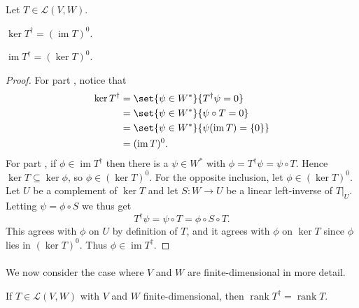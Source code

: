 \documentclass[a4paper, 11pt]{memoir}
\numberwithin{equation}{chapter}
\newcommand{\calL}{\mathcal{L}}
\newcommand{\im}{\operatorname{im}}
\newcommand{\newpar}{\paragraph{}}
\begin{document}
\begin{proposition}
    \label{prop:operator-adjoint-kernel-image}
    Let $T \in \calL(V,W)$.
    \begin{enumprop}
        \item \label{enum:operator-adjoint-kernel} $\ker T^\dagger = (\im T)^0$.
        \item \label{enum:operator-adjoint-image} $\im T^\dagger = (\ker T)^0$.
    \end{enumprop}
\end{proposition}

\begin{proof}
    For part , notice that
    \begin{align*}
        \ker T^\dagger
            &= \set{\psi \in W^*}{T^\dagger \psi = 0} \\
            &= \set{\psi \in W^*}{\psi \circ T = 0} \\
            &= \set{\psi \in W^*}{\psi(\im T) = \{0\}} \\
            &= (\im T)^0.
    \end{align*}
    For part , if $\phi \in \im T^\dagger$ then there is a $\psi \in W^*$ with $\phi = T^\dagger \psi = \psi \circ T$. Hence $\ker T \subseteq \ker \phi$, so $\phi \in (\ker T)^0$. For the opposite inclusion, let $\phi \in (\ker T)^0$. Let $U$ be a complement of $\ker T$ and let $S \colon W \to U$ be a linear left-inverse of $T|_U$. Letting $\psi = \phi \circ S$ we thus get
    \begin{equation*}
        T^\dagger \psi
            = \psi \circ T
            = \phi \circ S \circ T.
    \end{equation*}
    This agrees with $\phi$ on $U$ by definition of $T$, and it agrees with $\phi$ on $\ker T$ since $\phi$ lies in $(\ker T)^0$. Thus $\phi \in \im T^\dagger$.
\end{proof}


\newpar

We now consider the case where $V$ and $W$ are finite-dimensional in more detail.

\newcommand{\rank}{\operatorname{rank}}

\begin{corollary}
    \label{cor:adjoint-rank}
    If $T \in \calL(V,W)$ with $V$ and $W$ finite-dimensional, then $\rank T^\dagger = \rank T$.
\end{corollary}
\end{document}

